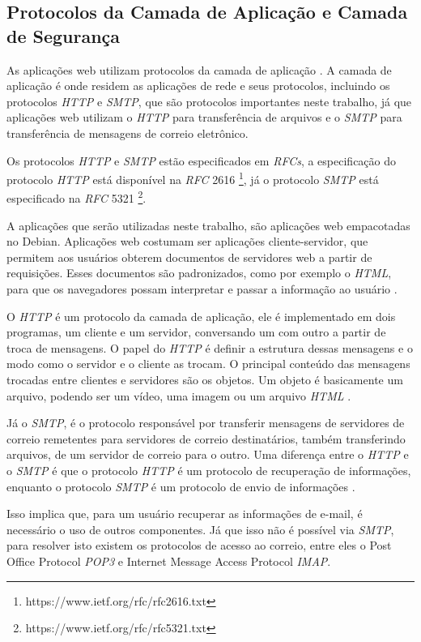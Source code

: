 \subsection{Protocolos da Camada de Aplicação e Camada de Segurança}

As aplicações web utilizam protocolos da camada de aplicação \cite{kurose2010redes}. 
A camada de aplicação é onde residem as 
aplicações de rede e seus protocolos, incluindo os protocolos \textit{HTTP} e 
\textit{SMTP}, que são protocolos importantes neste trabalho, já que 
aplicações web utilizam o \textit{HTTP} para transferência de arquivos e o \textit{SMTP} para
transferência de mensagens de correio eletrônico. 

Os protocolos \textit{HTTP} e \textit{SMTP} estão especificados em \textit{RFCs}, a 
especificação do protocolo \textit{HTTP} está disponível na \textit{RFC} 2616 
\footnote{https://www.ietf.org/rfc/rfc2616.txt}, já o protocolo \textit{SMTP} 
está especificado na \textit{RFC} 5321 \footnote{https://www.ietf.org/rfc/rfc5321.txt}.

A aplicações que serão utilizadas neste trabalho, são aplicações web empacotadas no
Debian. Aplicações web costumam ser aplicações cliente-servidor, que permitem aos
usuários obterem documentos de servidores web a partir de requisições. Esses documentos são padronizados, como por exemplo o \textit{HTML}, 
para que os navegadores possam interpretar e passar a informação ao usuário 
\cite{kurose2010redes}.

O \textit{HTTP} é um protocolo da camada de aplicação, ele é 
implementado em dois programas, um cliente e um servidor, conversando um 
com outro a partir de troca de mensagens. O papel do \textit{HTTP} é definir a 
estrutura dessas mensagens e o modo como o servidor e o cliente as trocam. O 
principal conteúdo das mensagens trocadas entre clientes e servidores são os 
objetos. Um objeto é basicamente um arquivo, podendo ser um vídeo, uma imagem 
ou um arquivo \textit{HTML} \cite{kurose2010redes}.

Já o \textit{SMTP}, é o protocolo responsável por transferir mensagens de servidores de correio
remetentes para servidores de correio destinatários, também transferindo arquivos,
de um servidor de correio para o outro. Uma diferença entre o \textit{HTTP} e o \textit{SMTP}
é que o protocolo \textit{HTTP} é um protocolo de recuperação de informações, enquanto
o protocolo \textit{SMTP} é um protocolo de envio de informações \cite{kurose2010redes}. 

Isso implica que, para um usuário recuperar as informações de e-mail, é necessário 
o uso de outros componentes. Já que isso não é possível via \textit{SMTP}, para 
resolver isto existem os protocolos de acesso ao correio, entre eles o 
Post Office Protocol \textit{POP3} e Internet Message Access Protocol \textit{IMAP}.

